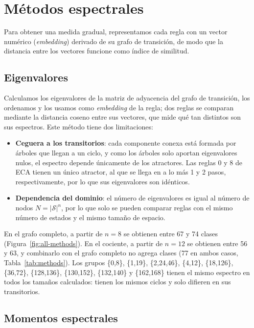 \section{Métodos espectrales}
\label{sec:spectral}

Para obtener una medida gradual, representamos cada regla con un vector numérico (\emph{embedding}) derivado de su grafo de transición, de modo que la distancia entre los vectores funcione como índice de similitud.

\subsection{Eigenvalores}

Calculamos los eigenvalores de la matriz de adyacencia del grafo de transición, los ordenamos y los usamos como \emph{embedding} de la regla; dos reglas se comparan mediante la distancia coseno entre sus vectores, que mide qué tan distintos son sus espectros. Este método tiene dos limitaciones:
\begin{itemize}
    \item \textbf{Ceguera a los transitorios}: cada componente conexa está formada por árboles que llegan a un ciclo, y como los árboles solo aportan eigenvalores nulos, el espectro depende únicamente de los atractores. Las reglas 0 y 8 de ECA tienen un único atractor, al que se llega en a lo más 1 y 2 pasos, respectivamente, por lo que sus eigenvalores son idénticos.
    \item \textbf{Dependencia del dominio}: el número de eigenvalores es igual al número de nodos $N = |\mathcal{S}|^n$, por lo que solo se pueden comparar reglas con el mismo número de estados y el mismo tamaño de espacio.
\end{itemize}

En el grafo completo, a partir de $n = 8$ se obtienen entre 67 y 74 clases (Figura~\ref{fig:all-methods}). En el cociente, a partir de $n = 12$ se obtienen entre 56 y 63, y combinarlo con el grafo completo no agrega clases (77 en ambos casos, Tabla~\ref{tab:methods}). Los grupos \{0,8\}, \{1,19\}, \{2,24,46\}, \{4,12\}, \{18,126\}, \{36,72\}, \{128,136\}, \{130,152\}, \{132,140\} y \{162,168\} tienen el mismo espectro en todos los tamaños calculados: tienen los mismos ciclos y solo difieren en sus transitorios.

\subsection{Momentos espectrales}


